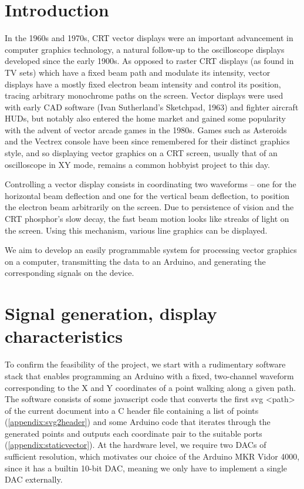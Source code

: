 \documentclass[12pt]{article}
\begin{document}
\section{Introduction}

In the 1960s and 1970s, CRT vector displays were an important advancement in computer graphics technology, a natural follow-up to the oscilloscope displays developed since the early 1900s. As opposed to raster CRT displays (as found in TV sets) which have a fixed beam path and modulate its intensity, vector displays have a mostly fixed electron beam intensity and control its position, tracing arbitrary monochrome paths on the screen. Vector displays were used with early CAD software (Ivan Sutherland's Sketchpad, 1963) and fighter aircraft HUDs, but notably also entered the home market and gained some popularity with the advent of vector arcade games in the 1980s. Games such as Asteroids and the Vectrex console have been since remembered for their distinct graphics style, and so displaying vector graphics on a CRT screen, usually that of an oscilloscope in XY mode, remains a common hobbyist project to this day.

Controlling a vector display consists in coordinating two waveforms -- one for the horizontal beam deflection and one for the vertical beam deflection, to position the electron beam arbitrarily on the screen. Due to persistence of vision and the CRT phosphor's slow decay, the fast beam motion looks like streaks of light on the screen. Using this mechanism, various line graphics can be displayed.

We aim to develop an easily programmable system for processing vector graphics on a computer, transmitting the data to an Arduino, and generating the corresponding signals on the device. 

\section{Signal generation, display characteristics}

To confirm the feasibility of the project, we start with a rudimentary software stack that enables programming an Arduino with a fixed, two-channel waveform corresponding to the X and Y coordinates of a point walking along a given path. The software consists of some javascript code that converts the first svg <path> of the current document into a C header file containing a list of points (\autoref{appendix:svg2header}) and some Arduino code that iterates through the generated points and outputs each coordinate pair to the suitable ports (\autoref{appendix:staticvector}). At the hardware level, we require two DACs of sufficient resolution, which motivates our choice of the Arduino MKR Vidor 4000, since it has a builtin 10-bit DAC, meaning we only have to implement a single DAC externally.
\end{document}
